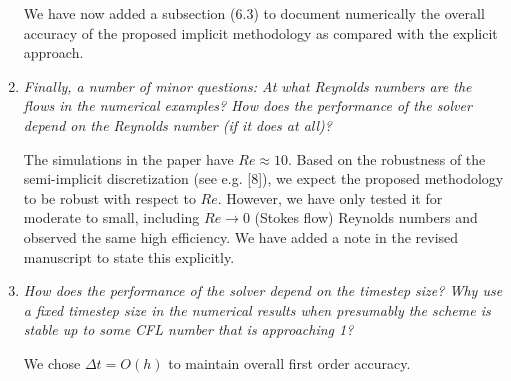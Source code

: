 \documentclass[12pt]{article}
\begin{document}
\begin{enumerate}
We have now added a subsection (6.3) to document numerically the overall accuracy of the proposed implicit methodology as compared with the explicit approach. 



\item {\em Finally, a number of minor questions: At what Reynolds numbers are the flows in the numerical examples?  How does the performance of the solver depend on the Reynolds number (if it does at all)?}

The simulations in the paper have $Re \approx 10$.  Based on the robustness of the semi-implicit discretization (see e.g. [8]), we expect the proposed methodology  to be robust with respect to $Re$. However, we have only tested it for moderate to small, including $Re \rightarrow 0$ (Stokes flow) Reynolds numbers and observed the same high efficiency. We have added a note in the revised manuscript to state this explicitly.
 

\item {\em How does the performance of the solver depend on the timestep size? 
Why use a fixed timestep size in the numerical results when presumably the
scheme is stable up to some CFL number that is approaching 1?}

 We chose $ \Delta t=O(h)$ to maintain overall first order accuracy. 
\end{enumerate}


 
\end{document}
